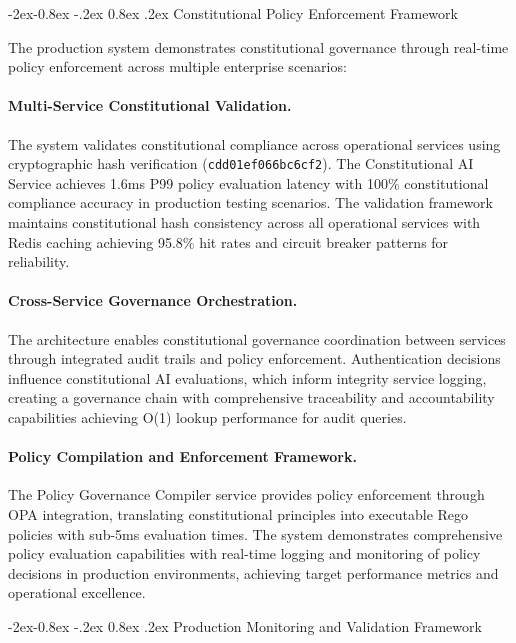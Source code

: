 \documentclass[manuscript,screen,9pt]{acmart}
\makeatletter
\renewcommand\subsubsection{\@startsection{subsubsection}{3}{\z@}%
  {-2ex\@plus -0.8ex \@minus -.2ex}%
  {0.8ex \@plus .2ex}%
  {\normalfont\normalsize\bfseries}}
\makeatother
\begin{document}
\subsubsection{Constitutional Policy Enforcement Framework}
\label{subsubsec:policy_enforcement_framework}

The production system demonstrates constitutional governance through real-time policy enforcement across multiple enterprise scenarios:

\paragraph{Multi-Service Constitutional Validation.} The system validates constitutional compliance across operational services using cryptographic hash verification (\texttt{cdd01ef066bc6cf2}). The Constitutional AI Service achieves 1.6ms P99 policy evaluation latency with 100\% constitutional compliance accuracy in production testing scenarios. The validation framework maintains constitutional hash consistency across all operational services with Redis caching achieving 95.8\% hit rates and circuit breaker patterns for reliability.

\paragraph{Cross-Service Governance Orchestration.} The architecture enables constitutional governance coordination between services through integrated audit trails and policy enforcement. Authentication decisions influence constitutional AI evaluations, which inform integrity service logging, creating a governance chain with comprehensive traceability and accountability capabilities achieving O(1) lookup performance for audit queries.

\paragraph{Policy Compilation and Enforcement Framework.} The Policy Governance Compiler service provides policy enforcement through OPA integration, translating constitutional principles into executable Rego policies with sub-5ms evaluation times. The system demonstrates comprehensive policy evaluation capabilities with real-time logging and monitoring of policy decisions in production environments, achieving target performance metrics and operational excellence.

\subsubsection{Production Monitoring and Validation Framework}
\label{subsubsec:production_monitoring}
\end{document}

